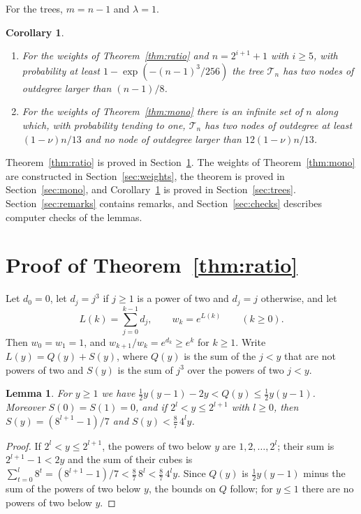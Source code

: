 \documentclass[11pt]{amsart}
\newtheorem{lemma}[theorem]{Lemma}
\newtheorem{corollary}[theorem]{Corollary}
\theoremstyle{remark}
\numberwithin{equation}{section}
\newcommand{\cT}{\mathcal T}
\begin{document}
For the trees, $m=n-1$ and $\lambda=1$.

\begin{corollary}\label{cor:trees}
\begin{enumerate}[label=\textup{(\roman*)},leftmargin=*]
\item For the weights of Theorem~\ref{thm:ratio} and $n=2^{i+1}+1$ with $i\ge5$, with probability at least $1-\exp(-(n-1)^3/256)$ the tree $\cT_n$ has two nodes of outdegree larger than $(n-1)/8$.
\item For the weights of Theorem~\ref{thm:mono} there is an infinite set of $n$ along which, with probability tending to one, $\cT_n$ has two nodes of outdegree at least $(1-\nu)n/13$ and no node of outdegree larger than $12(1-\nu)n/13$.
\end{enumerate}
\end{corollary}

Theorem~\ref{thm:ratio} is proved in Section~\ref{sec:ratio}. The weights of Theorem~\ref{thm:mono} are constructed in Section~\ref{sec:weights}, the theorem is proved in Section~\ref{sec:mono}, and Corollary~\ref{cor:trees} is proved in Section~\ref{sec:trees}. Section~\ref{sec:remarks} contains remarks, and Section~\ref{sec:checks} describes computer checks of the lemmas.

\section{Proof of Theorem~\ref{thm:ratio}}\label{sec:ratio}

Let $d_0=0$, let $d_j=j^3$ if $j\ge1$ is a power of two and $d_j=j$ otherwise, and let
\[
L(k)=\sum_{j=0}^{k-1}d_j,\qquad w_k=e^{L(k)}\qquad(k\ge0).
\]
Then $w_0=w_1=1$, and $w_{k+1}/w_k=e^{d_k}\ge e^k$ for $k\ge1$. Write $L(y)=Q(y)+S(y)$, where $Q(y)$ is the sum of the $j<y$ that are not powers of two and $S(y)$ is the sum of $j^3$ over the powers of two $j<y$.

\begin{lemma}\label{lem:QS}
For $y\ge1$ we have $\frac12y(y-1)-2y<Q(y)\le\frac12y(y-1)$. Moreover $S(0)=S(1)=0$, and if $2^l<y\le2^{l+1}$ with $l\ge0$, then $S(y)=(8^{l+1}-1)/7$ and $S(y)<\frac87\,4^ly$.
\end{lemma}

\begin{proof}
If $2^l<y\le2^{l+1}$, the powers of two below $y$ are $1,2,\dots,2^l$; their sum is $2^{l+1}-1<2y$ and the sum of their cubes is $\sum_{t=0}^l8^t=(8^{l+1}-1)/7<\frac87\,8^l<\frac87\,4^ly$. Since $Q(y)$ is $\frac12y(y-1)$ minus the sum of the powers of two below $y$, the bounds on $Q$ follow; for $y\le1$ there are no powers of two below $y$.
\end{proof}
\end{document}
